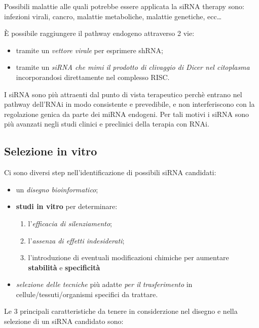 \documentclass[11pt]{book}
\begin{document}
Possibili malattie alle quali potrebbe essere applicata la siRNA therapy
sono: infezioni virali, cancro, malattie metaboliche, malattie
genetiche, ecc\ldots{}

È possibile raggiungere il pathway endogeno attraverso 2 vie:

\begin{itemize}
\itemsep1pt\parskip0pt
\item
  tramite un \emph{vettore virale} per esprimere shRNA;
\item
  tramite un \emph{siRNA che mimi il prodotto di clivaggio di Dicer nel
  citoplasma} incorporandosi direttamente nel complesso RISC.
\end{itemize}

I siRNA sono più attraenti dal punto di vista terapeutico perchè entrano
nel pathway dell'RNAi in modo consistente e prevedibile, e non
interferiscono con la regolazione genica da parte dei miRNA endogeni.
Per tali motivi i siRNA sono più avanzati negli studi clinici e
preclinici della terapia con RNAi.

\subsection{Selezione in vitro}\label{selezione-in-vitro}

Ci sono diversi step nell'identificazione di possibili siRNA candidati:

\begin{itemize}
\itemsep1pt\parskip0pt
\item
  un \emph{disegno bioinformatico};
\item
  \textbf{studi in vitro} per determinare:

  \begin{enumerate}
  \def\labelenumi{\arabic{enumi}.}
  \itemsep1pt\parskip0pt
  \item
    l'\emph{efficacia di silenziamento};
  \item
    l'\emph{assenza di effetti indesiderati};
  \item
    l'introduzione di eventuali modificazioni chimiche per aumentare
    \textbf{stabilità} e \textbf{specificità}
  \end{enumerate}
\item
  \emph{selezione delle tecniche} più adatte \emph{per il trasferimento}
  in cellule/tessuti/organismi specifici da trattare.
\end{itemize}

Le 3 principali caratteristiche da tenere in considerzione nel disegno e
nella selezione di un siRNA candidato sono:
\end{document}
